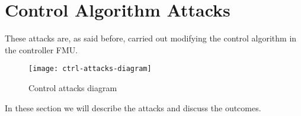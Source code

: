 \section{Control Algorithm Attacks}

These attacks are, as said before, carried out modifying the control algorithm
in the controller FMU\@.

\begin{figure}[htp]
	\texttt{[image: ctrl-attacks-diagram]}
	\caption{Control attacks diagram}\label{fig:ctrlatksdiagram}
\end{figure}

In these section we will describe the attacks and discuss the outcomes.




